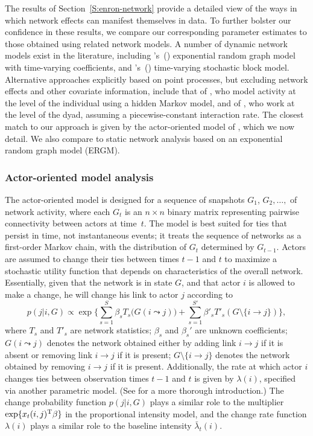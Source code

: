 \documentclass[final]{statsoc}
\begin{document}
The results of Section~\ref{S:enron-network} provide a detailed view of the
ways in which network effects can manifest themselves in data.  To further
bolster our confidence in these results, we compare our corresponding
parameter estimates to those obtained using related network models.  A number
of dynamic network models exist in the literature, including
's~(\citeyear{hanneke2010discrete})
exponential random graph model with time-varying coefficients,  and
's~(\citeyear{kolar2010estimating})
time-varying stochastic block model.  Alternative approaches explicitly based
on point processes, but excluding network effects and other covariate
information, include that of \citet{malmgen2009characterizing}, who model
activity at the level of the individual using a hidden Markov model, and of
\citet{heard2010bayesian}, who work at the level of the dyad, assuming a
piecewise-constant interaction rate.  The closest match to our approach is
given by the actor-oriented model of
\citet{snijders2001statistical,snijders2005models}, which we now detail.  We
also compare to static network analysis based on an exponential random graph
model (ERGM).

\subsubsection{Actor-oriented model analysis}

The actor-oriented model is designed for a sequence of snapshots $G_1$,
$G_2,\dotsc,$ of network activity, where each $G_t$ is an $n \times n$ binary
matrix representing pairwise connectivity between actors at time~$t$.  The
model is best suited for ties that persist in time, not instantaneous events;
it treats the sequence of networks as a first-order Markov chain, with the
distribution of $G_t$ determined by $G_{t-1}$.  Actors are assumed to change
their ties between times $t-1$ and $t$ to maximize a stochastic utility
function that depends on characteristics of the overall network.  Essentially,
given that the network is in state $G$, and that actor $i$ is allowed to make
a change, he will change his link to actor $j$ according to
\[
  p(j | i, G) \propto
    \exp\Big\{ \sum_{s=1}^S \beta_s T_s\big(G(i \leadsto j)\big)
      +
        \sum_{s=1}^{S'} \beta'_s T'_s(G \setminus \{ i \to j\})
    \Big\},
\]
where $T_s$ and $T'_s$ are network statistics; $\beta_s$ and $\beta_s'$ are
unknown coefficients; $G(i \leadsto j)$ denotes the network obtained either by
adding link $i \to j$ if it is absent or removing link $i \to j$ if it is
present; $G \setminus \{ i \to j \}$ denotes the network obtained by removing
$i \to j$ if it is present.  Additionally, the rate at which actor $i$ changes
ties between observation times $t-1$ and $t$ is given by $\lambda(i)$,
specified via another parametric model.  (See \citet{snijders2010introduction}
for a more thorough introduction.)  The change probability function $p(j | i,
G)$ plays a similar role to the multiplier $\exp\{ x_t(i,j)^{\mathrm{T}} \beta \}$
in the proportional intensity model, and the change rate function $\lambda(i)$
plays a similar role to the baseline intensity $\bar \lambda_t(i)$.
\end{document}
